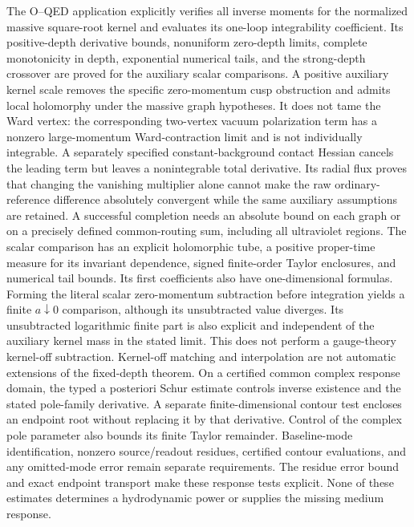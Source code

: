 \documentclass[final,5p,times,twocolumn,numbers,nopreprintline]{elsarticle}
\numberwithin{equation}{section}
\theoremstyle{definition}
\theoremstyle{remark}
\begin{document}
The O--QED application explicitly verifies all inverse moments for the
normalized massive square-root kernel and evaluates its one-loop
integrability coefficient. Its positive-depth derivative bounds,
nonuniform zero-depth limits, complete monotonicity in depth,
exponential numerical tails, and the strong-depth crossover are proved
for the auxiliary scalar comparisons. A positive auxiliary kernel scale removes
the specific zero-momentum cusp obstruction and admits local holomorphy
under the massive graph hypotheses. It does not tame the Ward vertex:
the corresponding two-vertex vacuum polarization term has a nonzero
large-momentum Ward-contraction limit and is not individually integrable.
A separately specified constant-background contact Hessian cancels the
leading term but leaves a nonintegrable total derivative. Its radial
flux proves that changing the vanishing multiplier alone cannot make
the raw ordinary-reference difference absolutely convergent while the
same auxiliary assumptions are retained. A successful completion needs
an absolute bound on each graph or on a precisely defined common-routing
sum, including all ultraviolet regions.
The scalar comparison has an explicit holomorphic tube, a positive
proper-time measure for its invariant dependence, signed finite-order
Taylor enclosures, and numerical tail bounds. Its first coefficients
also have one-dimensional formulas. Forming the literal scalar
zero-momentum subtraction before integration yields a finite
$a\downarrow0$ comparison, although its unsubtracted value diverges.
Its unsubtracted logarithmic finite part is also explicit and
independent of the auxiliary kernel mass in the stated limit.
This does not perform a gauge-theory kernel-off subtraction.
Kernel-off matching and interpolation are not
automatic extensions of the fixed-depth theorem. On a certified common
complex response domain, the typed a posteriori Schur estimate controls
inverse existence and the stated pole-family derivative. A separate
finite-dimensional contour test encloses an endpoint root without
replacing it by that derivative. Control of the complex pole parameter
also bounds its finite Taylor remainder. Baseline-mode identification,
nonzero source/readout residues, certified contour evaluations, and any
omitted-mode error remain separate requirements. The residue error bound
and exact endpoint transport make these response tests explicit.
None of these estimates
determines a hydrodynamic power or supplies the missing medium response.
\end{document}
